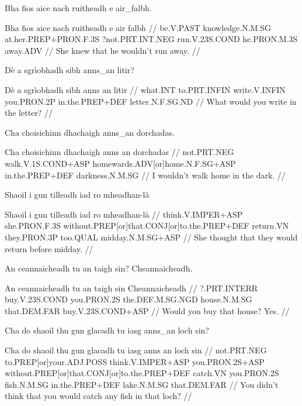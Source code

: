 \documentclass[a4paper,10pt]{article}
\begin{document}
\ex
\begingl
\glpre Bha fios aice nach ruitheadh e air\_falbh. 

\vspace{4mm}
\gla Bha fios aice nach ruitheadh e {air falbh}  //
\glb be.V.PAST knowledge.N.M.SG at.her.PREP+PRON.F.3S ?not.PRT.INT.NEG run.V.23S.COND he.PRON.M.3S away.ADV  //
\glft She knew that he wouldn't run away. //
\endgl
\xe

\ex
\begingl
\glpre Dè a sgrìobhadh sibh anns\_an litir? 

\vspace{4mm}
\gla Dè a sgrìobhadh sibh {anns an} litir  //
\glb what.INT to.PRT.INFIN write.V.INFIN you.PRON.2P in.the.PREP+DEF letter.N.F.SG.ND  //
\glft What would you write in the letter? //
\endgl
\xe

\ex
\begingl
\glpre Cha choisichinn dhachaigh anns\_an dorchadas. 

\vspace{4mm}
\gla Cha choisichinn dhachaigh {anns an} dorchadas  //
\glb not.PRT.NEG walk.V.1S.COND+ASP homewards.ADV[or]home.N.F.SG+ASP in.the.PREP+DEF darkness.N.M.SG  //
\glft I wouldn't walk home in the dark. //
\endgl
\xe

\ex
\begingl
\glpre Shaoil i gun tilleadh iad ro mheadhan-là 

\vspace{4mm}
\gla Shaoil i gun tilleadh iad ro mheadhan-là  //
\glb think.V.IMPER+ASP she.PRON.F.3S without.PREP[or]that.CONJ[or]to.the.PREP+DEF return.VN they.PRON.3P too.QUAL midday.N.M.SG+ASP  //
\glft She thought that they would return before midday. //
\endgl
\xe

\ex
\begingl
\glpre An ceannaicheadh tu an taigh sin? Cheannaicheadh. 

\vspace{4mm}
\gla An ceannaicheadh tu an taigh sin Cheannaicheadh  //
\glb ?.PRT.INTERR buy.V.23S.COND you.PRON.2S the.DEF.M.SG.NGD house.N.M.SG that.DEM.FAR buy.V.23S.COND+ASP  //
\glft Would you buy that house? Yes. //
\endgl
\xe

\ex
\begingl
\glpre Cha do shaoil thu gun glacadh tu iasg anns\_an loch sin? 

\vspace{4mm}
\gla Cha do shaoil thu gun glacadh tu iasg {anns an} loch sin  //
\glb not.PRT.NEG to.PREP[or]your.ADJ.POSS think.V.IMPER+ASP you.PRON.2S+ASP without.PREP[or]that.CONJ[or]to.the.PREP+DEF catch.VN you.PRON.2S fish.N.M.SG in.the.PREP+DEF lake.N.M.SG that.DEM.FAR  //
\glft You didn't think that you would catch any fish in that loch? //
\endgl
\xe
\end{document}
